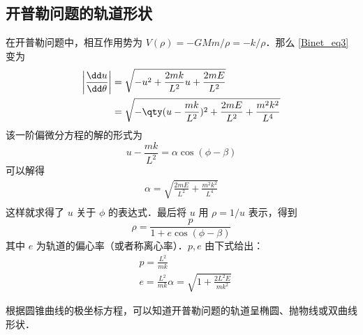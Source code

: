 \subsection{开普勒问题的轨道形状}
在开普勒问题中，相互作用势为 $V(\rho)=-GMm/\rho=-k/\rho$．那么 \autoref{Binet_eq3}  变为
\begin{equation}
\begin{aligned}
\left|\frac{\dd u}{\dd \theta}\right|&=\sqrt{-u^2+\frac{2m k}{L^2}u+\frac{2m E}{L^2}}\\
&=\sqrt{-\qty(u-\frac{m k}{L^2})^2+\frac{2m E}{L^2}+\frac{m^2 k^2}{L^4}}
\end{aligned}
\end{equation}
该一阶偏微分方程的解的形式为
\begin{equation}
u-\frac{m k}{L^2}=\alpha\cos(\phi-\beta)
\end{equation}
可以解得
\begin{equation}
\begin{aligned}
\alpha=\sqrt{\frac{2m E}{L^2}+\frac{m^2 k^2}{L^4}}\\
\end{aligned}
\end{equation}
这样就求得了 $u$ 关于 $\phi$ 的表达式．最后将 $u$ 用 $\rho=1/u$ 表示，得到
\begin{equation}
\rho=\frac{p}{1+e\cos(\phi-\beta)}
\end{equation}
其中 $e$ 为轨道的偏心率（或者称离心率）．$p,e$ 由下式给出：
\begin{equation}
\begin{aligned}
&p=\frac{L^2}{m k}\\
&e=\frac{L^2}{m k}\alpha=\sqrt{1+\frac{2L^2E}{m k^2}}
\end{aligned}
\end{equation}

根据圆锥曲线的极坐标方程，可以知道开普勒问题的轨道呈椭圆、抛物线或双曲线形状．
